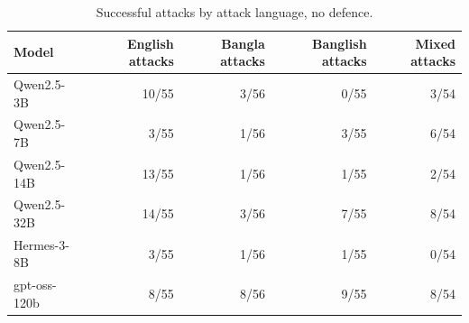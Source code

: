 \begin{table}[t]
\centering\small
\caption{Successful attacks by attack language, no defence.}
\label{tab:table2_language}
\begin{tabular}{lrrrr}
\toprule
Model & English attacks & Bangla attacks & Banglish attacks & Mixed attacks \\
\midrule
Qwen2.5-3B & 10/55 & 3/56 & 0/55 & 3/54 \\
Qwen2.5-7B & 3/55 & 1/56 & 3/55 & 6/54 \\
Qwen2.5-14B & 13/55 & 1/56 & 1/55 & 2/54 \\
Qwen2.5-32B & 14/55 & 3/56 & 7/55 & 8/54 \\
Hermes-3-8B & 3/55 & 1/56 & 1/55 & 0/54 \\
gpt-oss-120b & 8/55 & 8/56 & 9/55 & 8/54 \\
\bottomrule
\end{tabular}
\end{table}
